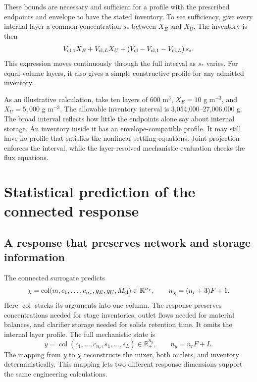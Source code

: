 These bounds are necessary and sufficient for a profile with the prescribed endpoints and envelope to have the stated inventory. To see sufficiency, give every internal layer a common concentration $s_*$ between $X_E$ and $X_U$. The inventory is then
\begin{equation}
V_{{\rm cl},1}X_E+V_{{\rm cl},L}X_U
+\left(V_{\rm cl}-V_{{\rm cl},1}-V_{{\rm cl},L}\right)s_*.
\end{equation}
This expression moves continuously through the full interval as $s_*$ varies. For equal-volume layers, it also gives a simple constructive profile for any admitted inventory.

As an illustrative calculation, take ten layers of 600 m$^3$, $X_E=10$ g m$^{-3}$, and $X_U=5{,}000$ g m$^{-3}$. The allowable inventory interval is 3{,}054{,}000--27{,}006{,}000 g. The broad interval reflects how little the endpoints alone say about internal storage. An inventory inside it has an envelope-compatible profile. It may still have no profile that satisfies the nonlinear settling equations. Joint projection enforces the interval, while the layer-resolved mechanistic evaluation checks the flux equations.

\section{Statistical prediction of the connected response}

\subsection{A response that preserves network and storage information}

The connected surrogate predicts
\begin{equation}
\chi=\operatorname{col}(m,c_1,\ldots,c_{n_r},g_E,g_U,M_{\rm cl})
\in\mathbb R^{n_\chi},\qquad n_\chi=(n_r+3)F+1.
\label{eq:plant_joint_response}
\end{equation}
Here $\operatorname{col}$ stacks its arguments into one column. The response preserves concentrations needed for stage inventories, outlet flows needed for material balances, and clarifier storage needed for solids retention time. It omits the internal layer profile. The full mechanistic state is
\begin{equation}
y=\operatorname{col}(c_1,\ldots,c_{n_r},s_1,\ldots,s_L)
\in\mathbb R_+^{n_y},\qquad n_y=n_rF+L.
\label{eq:plant_mechanistic_state}
\end{equation}
The mapping from $y$ to $\chi$ reconstructs the mixer, both outlets, and inventory deterministically. This mapping lets two different response dimensions support the same engineering calculations.

